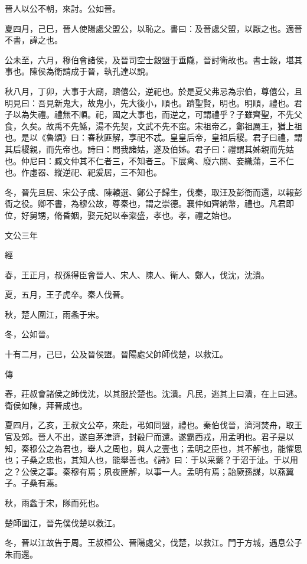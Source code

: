 \documentclass[fontset = none]{ctexart}
\begin{document}
晉人以公不朝，來討。公如晉。

夏四月，己巳，晉人使陽處父盟公，以恥之。書曰：及晉處父盟，以厭之也。適晉不書，諱之也。

公未至，六月，穆伯會諸侯，及晉司空士縠盟于垂隴，晉討衛故也。書士縠，堪其事也。陳侯為衛請成于晉，執孔達以說。

秋八月，丁卯，大事于大廟，躋僖公，逆祀也。於是夏父弗忌為宗伯，尊僖公，且明見曰：吾見新鬼大，故鬼小，先大後小，順也。躋聖賢，明也。明順，禮也。君子以為失禮。禮無不順。祀，國之大事也，而逆之，可謂禮乎？子雖齊聖，不先父食，久矣。故禹不先鯀，湯不先契，文武不先不窋。宋祖帝乙，鄭祖厲王，猶上祖也。是以《魯頌》曰：春秋匪解，享祀不忒。皇皇后帝，皇祖后稷。君子曰禮，謂其后稷親，而先帝也。詩曰：問我諸姑，遂及伯姊。君子曰：禮謂其姊親而先姑也。仲尼曰：臧文仲其不仁者三，不知者三。下展禽、廢六關、妾織蒲，三不仁也。作虛器、縱逆祀、祀爰居，三不知也。

冬，晉先且居、宋公子成、陳轅選、鄭公子歸生，伐秦，取汪及彭衙而還，以報彭衙之役。卿不書，為穆公故，尊秦也，謂之崇德。襄仲如齊納幣，禮也。凡君即位，好舅甥，脩昏姻，娶元妃以奉粢盛，孝也。孝，禮之始也。





文公三年


經



春，王正月，叔孫得臣會晉人、宋人、陳人、衛人、鄭人，伐沈，沈潰。

夏，五月，王子虎卒。秦人伐晉。

秋，楚人圍江，雨螽于宋。

冬，公如晉。

十有二月，己巳，公及晉侯盟。晉陽處父帥師伐楚，以救江。

傳



春，莊叔會諸侯之師伐沈，以其服於楚也。沈潰。凡民，逃其上曰潰，在上曰逃。衛侯如陳，拜晉成也。

夏四月，乙亥，王叔文公卒，來赴，弔如同盟，禮也。秦伯伐晉，濟河焚舟，取王官及郊。晉人不出，遂自茅津濟，封殽尸而還。遂霸西戎，用孟明也。君子是以知，秦穆公之為君也，舉人之周也，與人之壹也；孟明之臣也，其不解也，能懼思也；子桑之忠也，其知人也，能舉善也。《詩》曰：于以采蘩？于沼于沚。于以用之？公侯之事。秦穆有焉；夙夜匪解，以事一人。孟明有焉；詒厥孫謀，以燕翼子。子桑有焉。

秋，雨螽于宋，隊而死也。

楚師圍江，晉先僕伐楚以救江。

冬，晉以江故告于周。王叔桓公、晉陽處父，伐楚，以救江。門于方城，遇息公子朱而還。
\end{document}
